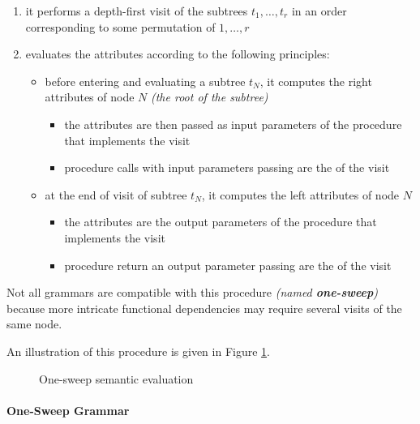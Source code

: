 \documentclass[english]{article}
\begin{document}
\begin{enumerate}[label=\arabic*, ref=(\arabic*)]
  \item it performs a depth-first visit of the subtrees \(t_1, \ldots, t_r\) in an order corresponding to some permutation of \(1, \ldots, r\)
  \item evaluates the attributes according to the following principles:
        \begin{itemize}
          \item before entering and evaluating a subtree \(t_N\), it computes the right attributes of node \(N\) \textit{(the root of the subtree)}
                \begin{itemize}[label=\(\rightarrow\)]
                  \item the attributes are then passed as input parameters of the procedure that implements the visit
                  \item procedure calls with input parameters passing are the  of the visit
                \end{itemize}
          \item at the end of visit of subtree \(t_N\), it computes the left attributes of node \(N\)
                \begin{itemize}[label=\(\rightarrow\)]
                  \item the attributes are the output parameters of the procedure that implements the visit
                  \item procedure return an output parameter passing are the  of the visit
                \end{itemize}
        \end{itemize}
\end{enumerate}

Not all grammars are compatible with this procedure \textit{(named \textbf{one-sweep})} because more intricate functional dependencies may require several visits of the same node.

An illustration of this procedure is given in Figure \ref{fig:one-sweep}.

\begin{figure}
  \centering
  \bigskip
  \caption{One-sweep semantic evaluation}
  \label{fig:one-sweep}
  \bigskip
\end{figure}

\paragraph{One-Sweep Grammar}
\label{par:one-sweep-grammar}
\end{document}
